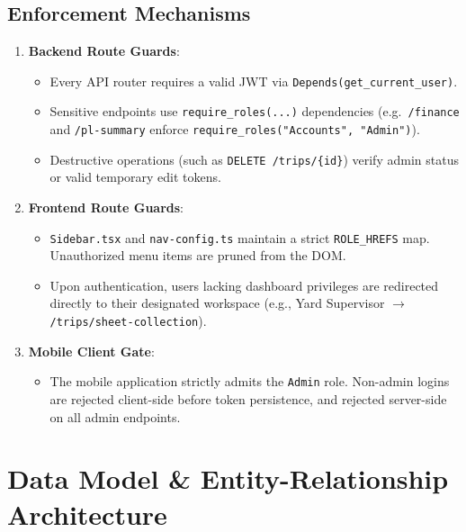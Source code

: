 \documentclass[11pt,a4paper]{article}
\begin{document}
\subsection{Enforcement Mechanisms}
\begin{enumerate}[leftmargin=1.4em,itemsep=4pt]
  \item \textbf{Backend Route Guards}:
  \begin{itemize}[leftmargin=1.2em,itemsep=2pt]
    \item Every API router requires a valid JWT via \texttt{Depends(get\_current\_user)}.
    \item Sensitive endpoints use \texttt{require\_roles(...)} dependencies (e.g.\ \texttt{/finance} and \texttt{/pl-summary} enforce \texttt{require\_roles("Accounts", "Admin")}).
    \item Destructive operations (such as \texttt{DELETE /trips/\{id\}}) verify admin status or valid temporary edit tokens.
  \end{itemize}
  \item \textbf{Frontend Route Guards}:
  \begin{itemize}[leftmargin=1.2em,itemsep=2pt]
    \item \texttt{Sidebar.tsx} and \texttt{nav-config.ts} maintain a strict \texttt{ROLE\_HREFS} map. Unauthorized menu items are pruned from the DOM.
    \item Upon authentication, users lacking dashboard privileges are redirected directly to their designated workspace (e.g., Yard Supervisor $\rightarrow$ \texttt{/trips/sheet-collection}).
  \end{itemize}
  \item \textbf{Mobile Client Gate}:
  \begin{itemize}[leftmargin=1.2em,itemsep=2pt]
    \item The mobile application strictly admits the \texttt{Admin} role. Non-admin logins are rejected client-side before token persistence, and rejected server-side on all admin endpoints.
  \end{itemize}
\end{enumerate}

\section{Data Model \& Entity-Relationship Architecture}
\end{document}
